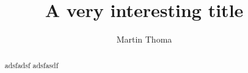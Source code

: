 \documentclass[9pt,technote,a4paper]{IEEEtran}
\title{A very interesting title}
\author{Martin Thoma}
\begin{document}
\maketitle
\begin{abstract}
adsfadsf adsfasdf
\end{abstract}


\end{document}
